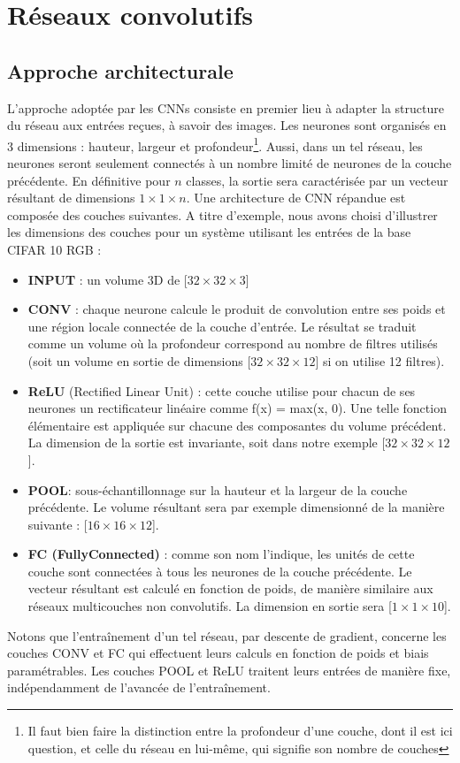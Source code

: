 \documentclass[12pt]{report}
\begin{document}
\section{Réseaux convolutifs}


\subsection{Approche architecturale}

L’approche adoptée par les \gls{CNN}s consiste en premier lieu à adapter la structure du réseau aux entrées reçues, à savoir des images.
Les neurones sont organisés en 3 dimensions : hauteur, largeur et profondeur\footnote{Il faut bien faire la distinction entre la profondeur d’une couche, dont il est ici question, et celle du réseau en lui-même, qui signifie son nombre de couches}.
Aussi, dans un tel réseau, les neurones seront seulement connectés à un nombre limité de neurones de la couche précédente.
En définitive pour  $n$ classes, la sortie sera caractérisée par un vecteur résultant de dimensions $ 1 \times 1 \times n$.
Une architecture de \gls{CNN} répandue est composée des couches suivantes. A titre d’exemple, nous avons choisi d’illustrer les dimensions des couches pour un système utilisant les entrées de la base \gls{CIFAR 10} RGB :

\begin{itemize}
  \item \textbf{INPUT} : un volume 3D de [$32 \times 32 \times 3$]
  \item \textbf{CONV} : chaque neurone calcule le produit de convolution entre ses poids et une région locale connectée de la couche d’entrée. Le résultat se traduit comme un volume où la profondeur correspond au nombre de filtres utilisés (soit un volume en sortie de dimensions [$32 \times 32 \times 12$] si on utilise 12 filtres).
  \item \textbf{ReLU} (Rectified Linear Unit) : cette couche utilise pour chacun de ses neurones un rectificateur linéaire comme f(x) = max(x, 0). Une telle fonction élémentaire est appliquée sur chacune des composantes du volume précédent. La dimension de la sortie est invariante, soit dans notre exemple [$32 \times 32 \times 12$].
  \item \textbf{POOL}: sous-échantillonnage sur la hauteur et la largeur de la couche précédente. Le volume résultant sera par exemple dimensionné de la manière suivante : [$16 \times 16 \times 12$].
  \item \textbf{FC (FullyConnected)} : comme son nom l’indique, les unités de cette couche sont connectées à tous les neurones de la couche précédente. Le vecteur résultant est calculé en fonction de poids, de manière similaire aux réseaux multicouches non convolutifs. La dimension en sortie sera [$1 \times 1 \times 10$].
\end{itemize}
Notons que l’entraînement d’un tel réseau, par descente de gradient, concerne les couches CONV et FC qui effectuent leurs calculs en fonction de poids et biais paramétrables. Les couches POOL et ReLU traitent leurs entrées de manière fixe, indépendamment de l’avancée de l’entraînement.
\end{document}
